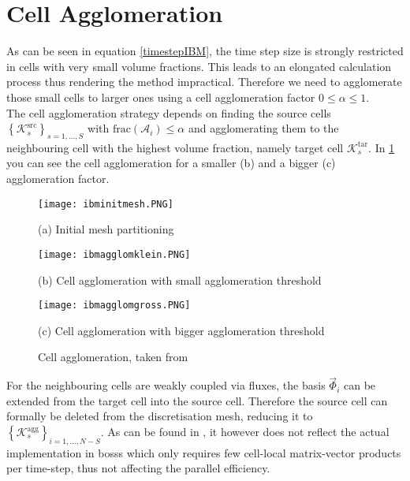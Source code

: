 	\section{Cell Agglomeration}
	\label{cellAgglomeration}
	As can be seen in equation \eqref{timestepIBM}, the time step size is strongly restricted in cells with very small volume fractions. This leads to an elongated calculation process thus rendering the method impractical. Therefore we need to agglomerate those small cells to larger ones using a cell agglomeration factor $0 \leq \alpha \leq 1$. \\
	The cell agglomeration strategy depends on finding the source cells $\left\{\mathcal{K}_s^\text{src} \right\}_{s=1,...,S}$ with $\text{frac}(\mathcal{A}_i) \leq \alpha$ and agglomerating them to the neighbouring cell with the highest volume fraction, namely target cell $\mathcal{K}_s^\text{tar}$. In \cref{fig:agglomeration} you can see the cell agglomeration for a smaller (b) and a bigger (c) agglomeration factor. \\
	\begin{figure}[htp]
		\centering
		\begin{minipage}[b]{0.3\textwidth}
			\centering
			\texttt{[image: ibminitmesh.PNG]}
			\caption*{(a) Initial mesh partitioning \newline \newline}
			\label{fig:init}
		\end{minipage}%
		\begin{minipage}[b]{0.3\textwidth}
			\centering
			\texttt{[image: ibmagglomklein.PNG]}
			\caption*{(b) Cell agglomeration with small agglomeration threshold}
			\label{fig:agglomgklein}
		\end{minipage}
		\begin{minipage}[b]{0.3\textwidth}
			\centering
			\texttt{[image: ibmagglomgross.PNG]}
			\caption*{(c) Cell agglomeration with bigger agglomeration threshold}
			\label{fig:agglomgross}
		\end{minipage}%
		\caption{Cell agglomeration, taken from \cite{paper}}\label{fig:agglomeration}
	\end{figure}
	
	For the neighbouring cells are weakly coupled via fluxes, the basis $\vec{\Phi}_i$ can be extended from the target cell into the source cell. Therefore the source cell can formally be deleted from the discretisation mesh, reducing it to $\left\{\mathcal{K}_s^\text{agg} \right\}_{i=1,...,N-S}$.
	As can be found in \textcite{paper}, it however does not reflect the actual implementation in \gls{bosss} which only requires few cell-local matrix-vector products per time-step, thus not affecting the parallel efficiency.
	

